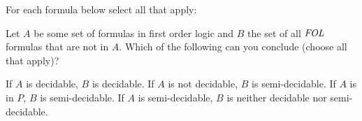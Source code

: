 \documentclass[addpoints]{exam}
\begin{document}
\begin{questions}
\question For each formula below select all that apply:


\vspace{5mm}
\question[4] Let $A$ be some set of formulas in first order logic and $B$ the
set of all $\mbox{\it FOL\/}$ formulas that are not in $A$. Which of
the following can you conclude (choose all that apply)?
\begin{checkboxes}
\CorrectChoice If $A$ is decidable, $B$ is decidable.
\choice If $A$ is not decidable, $B$ is semi-decidable.
\choice If $A$ is in $P$, $B$ is semi-decidable.
\CorrectChoice If $A$ is semi-decidable, $B$ is neither decidable nor semi-decidable.
\end{checkboxes}


\end{questions}
\end{document}
